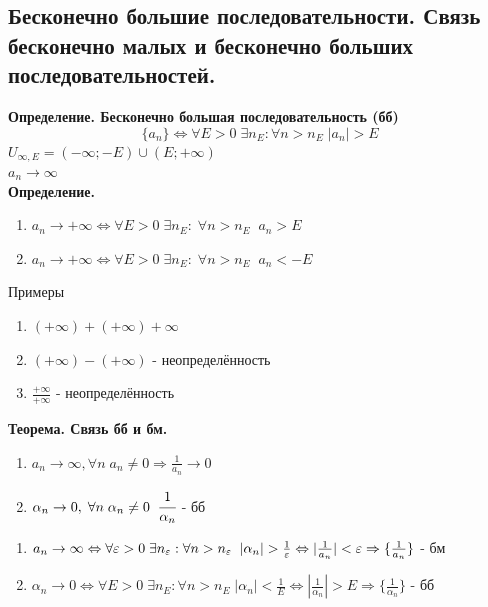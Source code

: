 \subsection{Бесконечно большие последовательности. Связь бесконечно малых и бесконечно больших последовательностей.}

\textbf{Определение. Бесконечно большая последовательность (бб)} 
\[\{a_n\} \Leftrightarrow \forall E > 0 \; \exists n_E: \forall n > n_E\; |a_n| > E\]
$U_{\infty, E} = (-\infty;-E)\cup(E;+\infty)$\\
$a_n \to \infty$\\
\textbf{Определение.}
\begin{enumerate}
	\item $a_n \to +\infty \Leftrightarrow \forall E > 0\; \exists n_E: \;\forall n > n_E\;\; a_n > E$
	\item $a_n \to +\infty \Leftrightarrow \forall E > 0\; \exists n_E: \;\forall n > n_E\;\; a_n < -E$
\end{enumerate}
Примеры
\begin{enumerate}
	\item $(+\infty) + (+\infty) +\infty$
	\item $(+\infty) - (+\infty)$ - неопределённость
	\item $\frac{+\infty}{+\infty}$ - неопределённость
\end{enumerate}
\textbf{Теорема. Связь бб и бм.}
\begin{enumerate}
	\item $a_n \to \infty, \forall n\; a_n \not=0 \Rightarrow \frac{1}{a_n} \to 0$
	\item $\alpha_n \to 0,\; \forall n\;\alpha_n\not=0\;\; \cfrac{1}{\alpha_n}$ - бб
\end{enumerate}
\begin{tcolorbox}[title=Доказательство]
	\begin{enumerate}
		\item $a_n \to \infty \Leftrightarrow \forall \varepsilon > 0\; \exists n_\varepsilon: \forall n > n_\varepsilon\;\; |\alpha_n| > \frac{1}{\varepsilon} \Leftrightarrow |\frac{1}{a_n}| < \varepsilon \Rightarrow \{\frac{1}{a_n}\}$ - бм
		\item $\alpha_n \to 0 \Leftrightarrow \forall E > 0\; \exists n_E: \forall n > n_E\; |\alpha_n| < \frac{1}{E} \Leftrightarrow |\frac{1}{\alpha_n}| > E \Rightarrow \{\frac{1}{\alpha_n}\}$ - бб
	\end{enumerate}
\end{tcolorbox}
